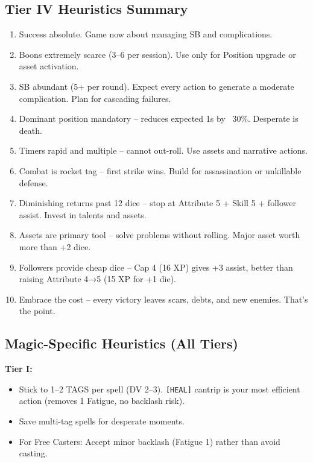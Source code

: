 \documentclass[11pt]{article}
\begin{document}
\subsection{Tier IV Heuristics Summary}
\begin{enumerate}
    \item Success absolute. Game now about managing SB and complications.
    \item Boons extremely scarce (3–6 per session). Use only for Position upgrade or asset activation.
    \item SB abundant (5+ per round). Expect every action to generate a moderate complication. Plan for cascading failures.
    \item Dominant position mandatory – reduces expected 1s by ~30\%. Desperate is death.
    \item Timers rapid and multiple – cannot out-roll. Use assets and narrative actions.
    \item Combat is rocket tag – first strike wins. Build for assassination or unkillable defense.
    \item Diminishing returns past 12 dice – stop at Attribute 5 + Skill 5 + follower assist. Invest in talents and assets.
    \item Assets are primary tool – solve problems without rolling. Major asset worth more than +2 dice.
    \item Followers provide cheap dice – Cap 4 (16 XP) gives +3 assist, better than raising Attribute 4→5 (15 XP for +1 die).
    \item Embrace the cost – every victory leaves scars, debts, and new enemies. That's the point.
\end{enumerate}

\subsection*{Magic-Specific Heuristics (All Tiers)}

\textbf{Tier I:}
\begin{itemize}
    \item Stick to 1–2 TAGS per spell (DV 2–3). \texttt{[HEAL]} cantrip is your most efficient action (removes 1 Fatigue, no backlash risk).
    \item Save multi-tag spells for desperate moments.
    \item For Free Casters: Accept minor backlash (Fatigue 1) rather than avoid casting.
\end{itemize}
\end{document}

